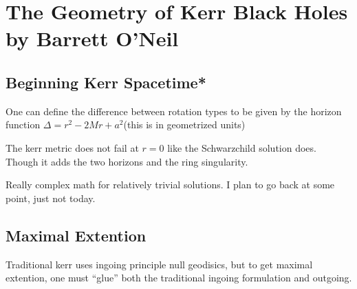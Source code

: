 \chapter{The Geometry  of Kerr Black Holes by Barrett O'Neil}

\section{Beginning Kerr Spacetime*}

One can define the difference between rotation types to be given by the horizon function $\Delta = r^2 -2Mr + a^2$(this is in geometrized units)

The kerr metric does not fail at $r=0$ like the Schwarzchild solution does. Though it adds the two horizons and the ring singularity.

Really complex math for relatively trivial solutions. I plan to go back at some point, just not today.

\section{Maximal Extention}

Traditional kerr uses ingoing principle null geodisics, but to get maximal extention, one must ``glue'' both the traditional ingoing formulation and outgoing.
